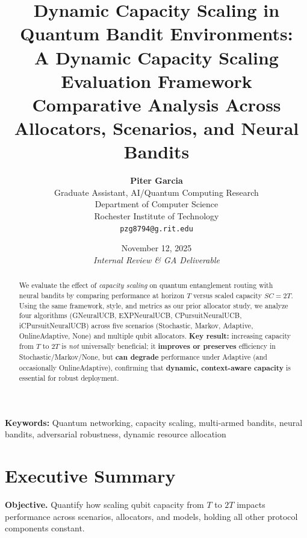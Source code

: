 \documentclass[11pt,a4paper]{article}
\title{
  \vspace{-1.5cm}
  \textbf{\LARGE Dynamic Capacity Scaling in Quantum Bandit Environments:} \\
  \vspace{0.4cm}
  \textbf{\Large A Dynamic Capacity Scaling Evaluation Framework} \\
  \vspace{0.6cm}
  \large Comparative Analysis Across Allocators, Scenarios, and Neural Bandits
}
\author{
  \textbf{Piter Garcia} \\
  Graduate Assistant, AI/Quantum Computing Research \\
  Department of Computer Science \\
  Rochester Institute of Technology \\
  \texttt{pzg8794@g.rit.edu}
}
\date{
  November 12, 2025 \\
  \vspace{0.3cm}
  \textit{Internal Review \& GA Deliverable}
}
\newcommand{\critical}[1]{\textcolor{criticalcolor}{\textbf{#1}}}
\newcommand{\success}[1]{\textcolor{successcolor}{\textbf{#1}}}
\begin{document}
\maketitle


\begin{abstract}
We evaluate the effect of \textit{capacity scaling} on quantum entanglement routing with neural bandits by comparing performance at horizon $T$ versus scaled capacity $SC{=}2T$. Using the same framework, style, and metrics as our prior allocator study, we analyze four algorithms (GNeuralUCB, EXPNeuralUCB, CPursuitNeuralUCB, iCPursuitNeuralUCB) across five scenarios (Stochastic, Markov, Adaptive, OnlineAdaptive, None) and multiple qubit allocators. 
\textbf{Key result:} increasing capacity from $T$ to $2T$ is \emph{not} universally beneficial; it \success{improves or preserves} efficiency in Stochastic/Markov/None, but \critical{can degrade} performance under Adaptive (and occasionally OnlineAdaptive), confirming that \textbf{dynamic, context-aware capacity} is essential for robust deployment.
\end{abstract}

\vspace{0.3cm}
\noindent\textbf{Keywords:} Quantum networking, capacity scaling, multi-armed bandits, neural bandits, adversarial robustness, dynamic resource allocation

\newpage

{\small\tableofcontents}
\newpage

\section{Executive Summary}

\textbf{Objective.} Quantify how scaling qubit capacity from $T$ to $2T$ impacts performance across scenarios, allocators, and models, holding all other protocol components constant.
\end{document}
